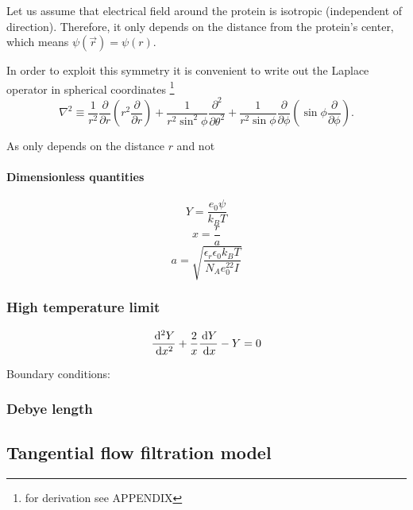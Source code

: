 Let us assume that electrical field around the protein is isotropic (independent of direction). Therefore,
it only depends on the distance from the protein's center, which means $\psi(\vec{r}) = \psi(r)$.

In order to exploit this symmetry it is convenient to write out the Laplace operator in spherical coordinates \footnote{for derivation see APPENDIX}
\begin{equation} \label{eq:lapaceInSphericalCoords1}
    \nabla^2 \equiv \frac{1}{r^2}\frac{\partial}{\partial r} \left(r^2\frac{\partial}{\partial r}\right)
    + \frac{1}{r^2 \sin^2\phi} \frac{\partial^2}{\partial\theta^2}
    + \frac{1}{r^2 \sin \phi} \frac{\partial}{\partial \phi}\left(\sin\phi \frac{\partial}{\partial\phi}\right).
\end{equation}

As \psi only depends on the distance $r$ and not




\paragraph*{Dimensionless quantities}


\[Y = \frac{e_0 \psi}{k_B T}\]
\[x = \frac{r}{a}\]
\[a = \sqrt{\frac{\epsilon_r\epsilon_0k_BT}{N_Ae_0^22I}} \]



\subsubsection{High temperature limit}

\begin{equation}\label{eq:pbHighTempDimensionless}
    \frac{\,\mathrm{d}^2Y}{\,\mathrm{d} x^2} + \frac{2}{x} \frac{\,\mathrm{d} Y}{\,\mathrm{d} x} - Y = 0
\end{equation}

Boundary conditions:

\subsubsection{Debye length}

\subsection{Tangential flow filtration model}